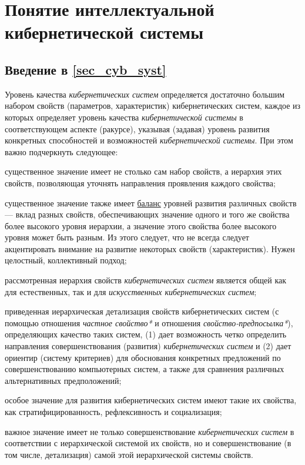 \section{Понятие интеллектуальной кибернетической системы}
{\label{sec_cyb_syst}} 

\subsection*{Введение в \ref{sec_cyb_syst}}

Уровень качества \textit{кибернетических систем} определяется достаточно большим набором свойств (параметров, характеристик) кибернетических систем, каждое из которых определяет уровень качества \textit{кибернетической системы} в соответствующем аспекте (ракурсе), указывая (задавая) уровень развития конкретных способностей и возможностей \textit{кибернетической системы}. 
При этом важно подчеркнуть следующее:
\begin{textitemize}
	\item существенное значение имеет не столько сам набор свойств, а иерархия этих свойств, позволяющая уточнять направления проявления каждого свойства;
	\item существенное значение также имеет \uline{баланс} уровней развития различных свойств --- вклад разных свойств, обеспечивающих значение одного и того же свойства более высокого уровня иерархии, а значение этого свойства более высокого уровня может быть разным.
	Из этого следует, что не всегда следует акцентировать внимание на развитие некоторых свойств (характеристик).
	Нужен целостный, коллективный подход;
	\item рассмотренная иерархия свойств \textit{кибернетических систем} является общей как для естественных, так и для \textit{искусственных кибернетических систем};
	\item приведенная иерархическая детализация свойств кибернетических систем (с помощью отношения \textit{частное свойство*} и отношения \textit{свойство-предпосылка*}), определяющих качество таких систем, (1) дает возможность четко определить направления совершенствования (развития) \textit{кибернетических систем} и (2) дает ориентир (систему критериев) для обоснования конкретных предложений по совершенствованию компьютерных систем, а также для сравнения различных альтернативных предположений;
	\item особое значение для развития кибернетических систем имеют такие их свойства, как стратифицированность, рефлексивность и социализация;
	\item важное значение имеет не только совершенствование \textit{кибернетических систем} в соответствии с иерархической системой их свойств, но и совершенствование (в том числе, детализация) самой этой иерархической системы свойств.
\end{textitemize}

